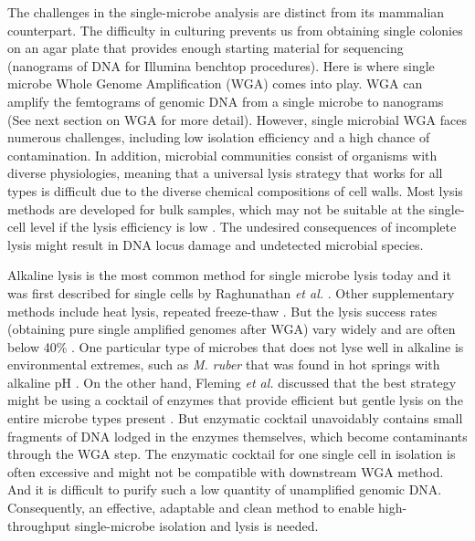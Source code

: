 The challenges in the single-microbe analysis are distinct from its mammalian counterpart. The difficulty in culturing prevents us from obtaining single colonies on an agar plate that provides enough starting material for sequencing (nanograms of DNA for Illumina benchtop procedures). Here is where single microbe Whole Genome Amplification (WGA) comes into play. WGA can amplify the femtograms of genomic DNA from a single microbe to nanograms (See next section on WGA for more detail). However, single microbial WGA faces numerous challenges, including low isolation efficiency and a high chance of contamination. In addition, microbial communities consist of organisms with diverse physiologies, meaning that a universal lysis strategy that works for all types is difficult due to the diverse chemical compositions of cell walls. Most lysis methods are developed for bulk samples, which may not be suitable at the single-cell level if the lysis efficiency is low \cite{Blainey:2013dp}. The undesired consequences of incomplete lysis might result in DNA locus damage and undetected microbial species. 

Alkaline lysis is the most common method for single microbe lysis today and it was first described for single cells by Raghunathan \textit{et al.} \cite{Raghunathan:2005fg}. Other supplementary methods include heat lysis, repeated freeze-thaw \cite{Swan:2011hb,Fleming:2011dv}. But the lysis success rates (obtaining pure single amplified genomes after WGA) vary widely and are often below 40\%  \cite{Stepanauskas:2012ja}. One particular type of microbes that does not lyse well in alkaline is environmental extremes, such as \textit{M. ruber} that was found in hot springs with alkaline pH \cite{NOBRE:1996ke}. On the other hand, Fleming \textit{et al.} discussed that the best strategy might be using a cocktail of enzymes that provide efficient but gentle lysis on the entire microbe types present \cite{Fleming:2011dv}. But enzymatic cocktail unavoidably contains small fragments of DNA lodged in the enzymes themselves, which become contaminants through the WGA step. The enzymatic cocktail for one single cell in isolation is often excessive and might not be compatible with downstream WGA method. And it is difficult to purify such a low quantity of unamplified genomic DNA. Consequently, an effective, adaptable and clean method to enable high-throughput single-microbe isolation and lysis is needed. %

